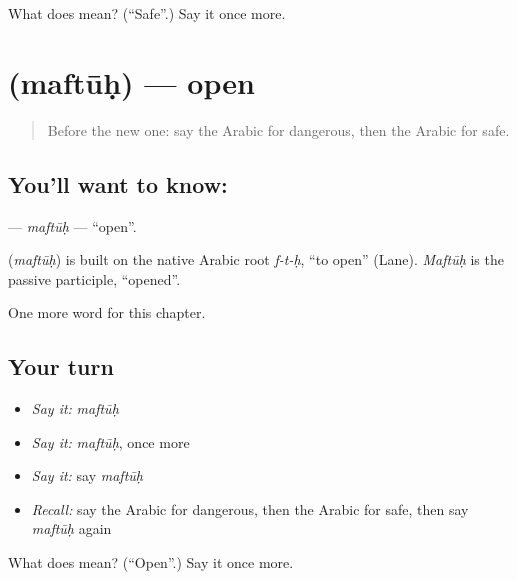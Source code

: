\begin{tcolorbox}[breakable,colback=teal!4,colframe=teal!35!black,title={Before you move on}]
What does  mean? (\textquotedblleft{}Safe\textquotedblright{}.) Say it once more.
\end{tcolorbox}
\section[\texorpdfstring{\ar{مفتوح} (maftūḥ)}{مفتوح (maftūḥ)}]{ (maftūḥ) — open}

\label{lesson:AR-C146-maftuh}



\begin{quote}
Before the new one: say the Arabic for dangerous, then the Arabic for safe.
\end{quote}

\subsection*{You'll want to know: }
\textbf{} — \emph{maftūḥ} — \textquotedblleft{}open\textquotedblright{}.

\begin{cousinweb}
\textbf{} (\emph{maftūḥ}) is built on the native Arabic root \emph{f-t-ḥ}, \textquotedblleft{}to open\textquotedblright{} (Lane). \emph{Maftūḥ} is the passive participle, \textquotedblleft{}opened\textquotedblright{}.
\end{cousinweb}

\begin{grammarlens}[title={What you've built}]
One more word for this chapter.
\end{grammarlens}

\subsection*{Your turn}
\begin{itemize}
\raggedright
  \item \emph{Say it:} \emph{maftūḥ}
  \item \emph{Say it:} \emph{maftūḥ}, once more
  \item \emph{Say it:} say \emph{maftūḥ}
  \item \emph{Recall:} say the Arabic for dangerous, then the Arabic for safe, then say \emph{maftūḥ} again
\end{itemize}

\begin{tcolorbox}[breakable,colback=teal!4,colframe=teal!35!black,title={Before you move on}]
What does  mean? (\textquotedblleft{}Open\textquotedblright{}.) Say it once more.
\end{tcolorbox}
